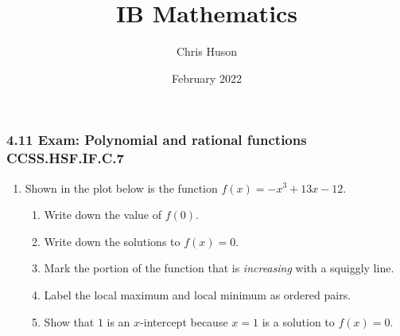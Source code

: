 \documentclass[12pt, twoside]{article}
\title{IB Mathematics}
\author{Chris Huson}
\date{February 2022}
\begin{document}
\subsubsection*{4.11 Exam: Polynomial and rational functions \hfill CCSS.HSF.IF.C.7}
\begin{enumerate}
    \item Shown in the plot below is the function $f(x)=-x^3+13x-12$.
    \begin{multicols}{2}
    \begin{enumerate}
        \item Write down the value of $f(0)$. \vspace{1cm}
        \item Write down the solutions to $f(x)=0$. \vspace{1cm}
        \item Mark the portion of the function that is \emph{increasing} with a squiggly line.
        \item Label the local maximum and local minimum as ordered pairs. %
        \item Show that $1$ is an $x$-intercept because $x=1$ is a solution to $f(x)=0$.
    \end{enumerate}
    \end{multicols} \vspace{4cm}


\end{enumerate}
\end{document}
